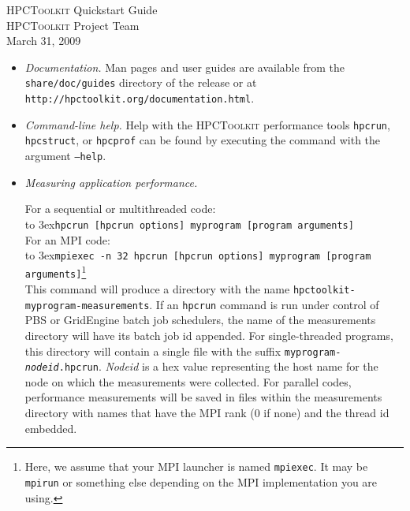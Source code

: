 \documentclass[10pt]{article}
\newcommand{\HPCToolkit}{\textsc{HPCToolkit}}
\begin{document}


\newcommand\lindent{\hbox to 3ex{\hfil}}


\begin{center}
{\Large \HPCToolkit{} Quickstart Guide}\\[1ex]
{\HPCToolkit{} Project Team}\\
March 31, 2009
\end{center}



\begin{itemize}
\item{\em Documentation.} Man pages and user guides are available from the {\tt share/doc/guides} directory of the release or at {\tt http://hpctoolkit.org/documentation.html}.  
\item {\em Command-line help.} Help with the \HPCToolkit{} performance tools {\tt hpcrun}, {\tt hpcstruct}, or {\tt hpcprof} can be found by executing the command with the argument {\tt --help}.
\item{ \em Measuring application performance.}

For a sequential or multithreaded code:\\
\lindent {\tt hpcrun [hpcrun options] myprogram [program arguments] }\\[1ex]
For an MPI code:\\
\lindent {\tt mpiexec -n 32 hpcrun [hpcrun options] myprogram [program arguments]}\footnote{Here, we assume that your MPI launcher is named {\tt mpiexec}. It may be {\tt mpirun} or something else depending on the MPI implementation you are using.}\\[1ex]
\sloppy This command will produce a directory with the name {\tt hpctoolkit-myprogram-measurements}. If an {\tt hpcrun} command is run under control of PBS or GridEngine batch job schedulers, the name of the measurements directory will have its batch job id appended. For single-threaded programs, this directory will contain a single file with the suffix {\tt myprogram-{\em nodeid}.hpcrun}. {\em Nodeid} is a hex value representing the host name for the node on which the measurements were collected. For parallel codes, performance measurements will be saved in files within the measurements directory with names that have the MPI rank (0 if none) and the thread id embedded.


\end{itemize}
\end{document}
